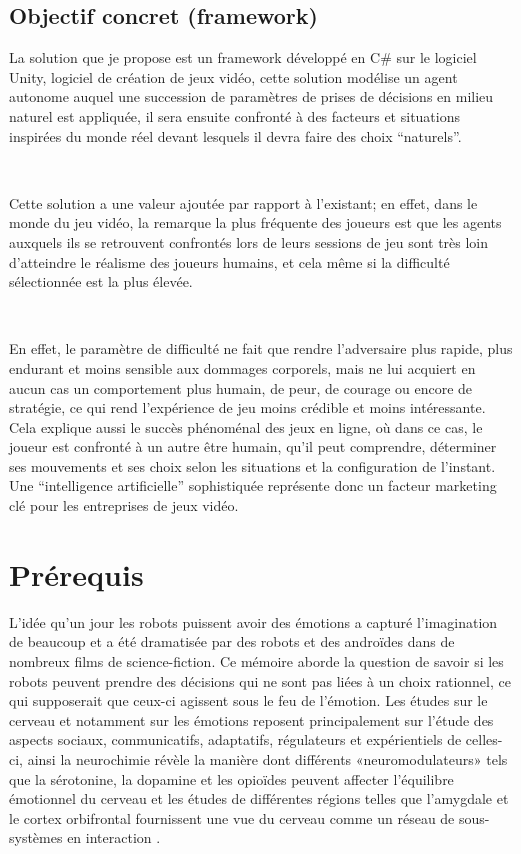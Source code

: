 \subsection{Objectif concret (framework)}

La solution que je propose est un framework développé en C\# sur le logiciel Unity, logiciel de création de jeux vidéo, cette solution modélise un agent autonome auquel une succession de paramètres de prises de décisions en milieu naturel est appliquée, il sera ensuite confronté à des facteurs et situations inspirées du monde réel devant lesquels il devra faire des choix “naturels”.

~\par
Cette solution a une valeur ajoutée par rapport à l'existant; en effet, dans le monde du jeu vidéo, la remarque la plus fréquente des joueurs est que les agents auxquels ils se retrouvent confrontés lors de leurs sessions de jeu sont très loin d’atteindre le réalisme des joueurs humains, et cela même si la difficulté sélectionnée est la plus élevée.

~\par
En effet, le paramètre de difficulté ne fait que rendre l’adversaire plus rapide, plus endurant et moins sensible aux dommages corporels,  mais ne lui acquiert en aucun cas un comportement plus humain, de peur, de courage ou encore de stratégie, ce qui rend l'expérience de jeu moins crédible et moins intéressante. Cela explique aussi le succès phénoménal des jeux en ligne, où dans ce cas, le joueur est confronté à un autre être humain, qu’il peut comprendre, déterminer ses mouvements et ses choix selon les situations et la configuration de l’instant. Une “intelligence artificielle” sophistiquée représente donc un facteur marketing clé pour les entreprises de jeux vidéo. 



\section{Prérequis}

L'idée qu'un jour les robots puissent avoir des émotions a capturé l'imagination de beaucoup et a été dramatisée par des robots et des androïdes dans de nombreux films de science-fiction. Ce mémoire aborde la question de savoir si les robots peuvent prendre des décisions qui ne sont pas liées à un choix rationnel, ce qui supposerait que ceux-ci agissent sous le feu de l’émotion. Les études sur le cerveau et notamment sur  les émotions reposent principalement sur l’étude des aspects sociaux, communicatifs, adaptatifs, régulateurs et expérientiels de celles-ci, ainsi la neurochimie révèle la manière dont différents «neuromodulateurs» tels que la sérotonine, la dopamine et les opioïdes peuvent affecter l’équilibre émotionnel du cerveau et les études de différentes régions telles que l'amygdale et le cortex orbifrontal fournissent une vue du cerveau comme un réseau de sous-systèmes en interaction \parencite{whoneedsemotions}.


